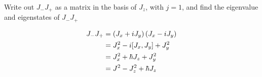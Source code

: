 \documentclass[UTF8,12pt]{article} %
\makeatletter
\newenvironment{proof}[1][\protect\proofname]{\par
\normalfont\topsep6\p@\@plus6\p@\relax
\trivlist
\itemindent\parindent
\item[\hskip\labelsep
\scshape
#1]\ignorespaces
}{%
\endtrivlist\@endpefalse
}
\renewcommand{\proofname}{\it{Solution}}
\makeatother
\begin{document}
\begin{exercise}{}{}
Write out $J_- J_+$ as a matrix in the basis of $J_z$, with $j=1$, and find the eigenvalue and eigenstates of $J_-J_+$
\end{exercise}

\begin{proof}[解]
\begin{align}
J_-J_+ &= \left(J_x + iJ_y\right)\left(J_x - iJ_y\right) \\
&= J_x^2 -i[J_x, J_y] + J_y^2 \notag\\
&= J_x^2 + \hbar J_z + J_y^2 \notag\\
&= J^2 - J_z^2 + \hbar J_z
\end{align}
\end{proof}
\end{document}
